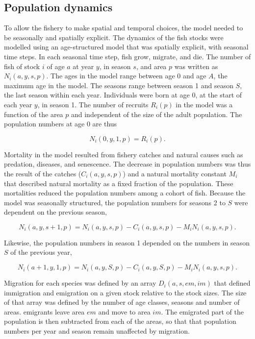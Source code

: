 \documentclass[12pt,oneline,a4paper,numbib]{ouparticle}
\numberwithin{equation}{subsection} %
\begin{document}
\subsection{Population dynamics}


To allow the fishery to make spatial and temporal choices, the model needed to be seasonally and spatially explicit. The dynamics of the fish stocks were modelled using an age-structured model that was spatially explicit, with seasonal time steps. In each seasonal time step, fish grow, migrate, and die. The number of fish of stock $i$ of age $a$ at year $y$, in season $s$, and area $p$ was written as $N_i (a, y, s, p)$. The ages in the model range between age 0 and age $A$, the maximum age in the model. The seasons range between season 1 and season $S$, the last season within each year. Individuals were born at age 0, at the start of each year $y$, in season 1. The number of recruits $R_i (p)$ in the model was a function of the area $p$ and independent of the size of the adult population. The population numbers at age 0 are thus
 
\begin{equation}
N_i (0, y, 1, p) = R_i (p).
\end{equation}

Mortality in the model resulted from fishery catches and natural causes such as predation, diseases, and senescence. The decrease in population numbers was thus the result of the catches ($C_i (a, y, s, p)$) and a natural mortality constant $M_i$ that described natural mortality as a fixed fraction of the population. These mortalities reduced the population numbers among a cohort of fish. Because the model was seasonally structured, the population numbers for seasons 2 to $S$ were dependent on the previous season,

\begin{equation}
N_i (a, y, s+1, p) = N_i (a, y, s, p) - C_i (a, y, s, p) - M_i N_i (a, y, s, p) . 
\end{equation}

Likewise, the population numbers in season 1 depended on the numbers in season $S$ of the previous year,

\begin{equation}
N_i (a+1, y, 1, p) = N_i (a, y, S, p) - C_i (a, y, S, p) - M_i N_i (a, y, s, p). 
\end{equation}

Migration for each species was defined by an array $D_i (a, s, em, im)$ that defined immigration and emigration on a given stock relative to the stock sizes. The size of that array was defined by the number of age classes, seasons and number of areas. emigrants leave area $em$ and move to area $im$. The emigrated part of the population is then subtracted from each of the areas, so that that population numbers per year and season remain unaffected by migration.
\end{document}
